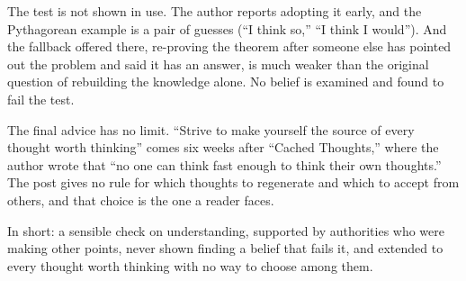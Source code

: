 \begin{afterword}
The test is not shown in use. The author reports adopting it early, and the Pythagorean example is a pair of guesses (``I think so,'' ``I think I would''). And the fallback offered there, re-proving the theorem after someone else has pointed out the problem and said it has an answer, is much weaker than the original question of rebuilding the knowledge alone. No belief is examined and found to fail the test.

The final advice has no limit. ``Strive to make yourself the source of every thought worth thinking'' comes six weeks after ``Cached Thoughts,'' where the author wrote that ``no one can think fast enough to think their own thoughts.'' The post gives no rule for which thoughts to regenerate and which to accept from others, and that choice is the one a reader faces.

In short: a sensible check on understanding, supported by authorities who were making other points, never shown finding a belief that fails it, and extended to every thought worth thinking with no way to choose among them.
\end{afterword}
